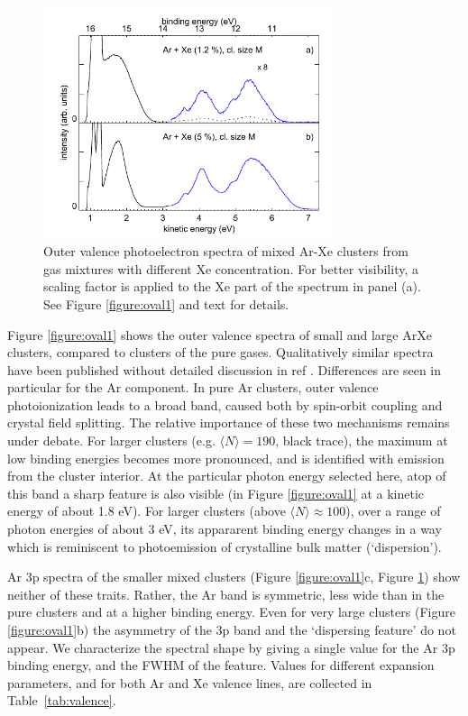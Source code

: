 \begin{figure}[ht]
 \centering
 \includegraphics[width=8.5cm]{pics/figure_oval_2.pdf}
 \caption{
Outer valence photoelectron spectra of mixed Ar-Xe clusters from gas mixtures with different Xe concentration. 
For better visibility, a scaling factor is applied to the Xe part of the spectrum in panel (a).
See Figure \ref{figure:oval1} and text for details.
}
 \label{figure:oval2}
\end{figure}

Figure \ref{figure:oval1} shows the outer valence spectra of small and large ArXe clusters, compared to clusters of the pure gases. 
Qualitatively similar spectra have been published without detailed discussion in ref .
Differences are seen in particular for the Ar component. 
In pure Ar clusters, outer valence photoionization leads to a broad band, caused both by spin-orbit coupling and crystal field splitting. 
The relative importance of these two mechanisms remains under debate.\cite{hergenhahnprb,rolles,foerstel_arg1_2010} 
For larger clusters (e.g. $\langle N\rangle = 190$, black trace), the maximum at low binding energies becomes more pronounced, and is identified with emission from the cluster interior.\cite{hergenhahnprb,rolles}
At the particular photon energy selected here, atop of this band a sharp feature is also visible (in Figure \ref{figure:oval1} at a kinetic energy of about 1.8 eV).
For larger clusters (above $\langle N\rangle \approx 100$), over a range of photon energies of about 3 eV, its appararent binding energy changes in a way which is reminiscent to photoemission of crystalline bulk matter (`dispersion').\cite{foerstel_arg1_2010,foerstel_arg2_2011} 

Ar 3p spectra of the smaller mixed clusters (Figure \ref{figure:oval1}c, Figure \ref{figure:oval2}) show neither of these traits.
Rather, the Ar band is symmetric, less wide than in the pure clusters and at a higher binding energy.
Even for very large clusters (Figure \ref{figure:oval1}b) the asymmetry of the 3p band and the `dispersing feature' do not appear.
We characterize the spectral shape by giving a single value for the Ar 3p binding energy, and the FWHM of the feature.
Values for different expansion parameters, and for both Ar and Xe valence lines, are collected in Table\ \ref{tab:valence}.

